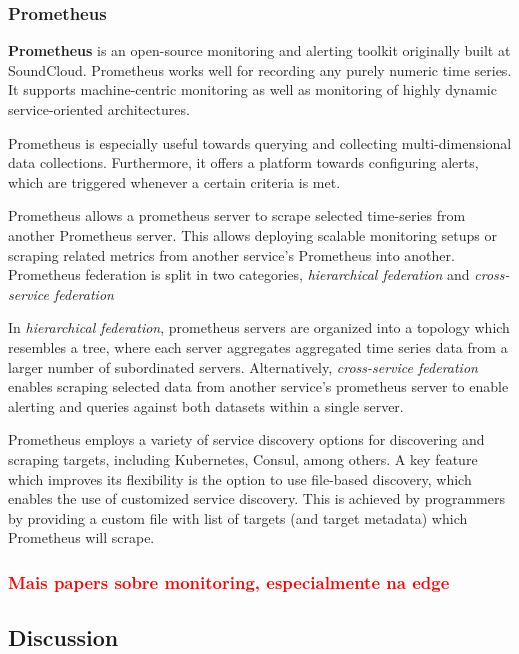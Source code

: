 \subsubsection{Prometheus}

\textbf{Prometheus} \cite{prometheus} is an open-source monitoring and alerting toolkit originally built at SoundCloud. Prometheus works well for recording any purely numeric time series. It supports machine-centric monitoring as well as monitoring of highly dynamic service-oriented architectures. 

Prometheus is especially useful towards querying and collecting multi-dimensional data collections. Furthermore, it offers a platform towards configuring alerts, which are triggered whenever a certain criteria is met.

Prometheus allows a prometheus server to scrape selected time-series from another Prometheus server. This allows deploying scalable monitoring setups or scraping related metrics from another service's Prometheus into another. Prometheus federation is split in two categories, \textit{hierarchical federation} and \textit{cross-service federation} 

In \textit{hierarchical federation}, prometheus servers are organized into a topology which resembles a tree, where each server aggregates aggregated time series data from a larger number of subordinated servers. Alternatively,  \textit{cross-service federation} enables scraping selected data from another service's prometheus server to enable alerting and queries against both datasets within a single server. 

Prometheus employs a variety of service discovery options for discovering and scraping targets, including Kubernetes, Consul, among others. A key feature which improves its flexibility is the option to use file-based discovery,  which enables the use of customized service discovery. This is achieved by programmers by providing a custom file with list of targets (and target metadata) which Prometheus will scrape.

\subsubsection{\textcolor{red}{Mais papers sobre monitoring, especialmente na edge}}

\subsection{Discussion}

